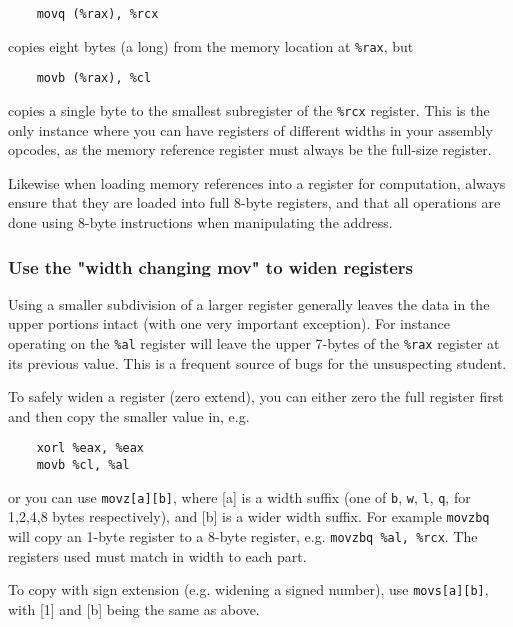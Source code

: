 \documentclass[11pt]{article}
\begin{document}
\begin{lstlisting}
    movq (%rax), %rcx
\end{lstlisting}

copies eight bytes (a  long) from the memory location at \texttt{\%rax}, but

\begin{lstlisting}
    movb (%rax), %cl
\end{lstlisting}

copies a single byte to the smallest subregister of the \texttt{\%rcx} register. This is
the only instance where you can have registers of different widths in your assembly
opcodes, as the memory reference register must always be the full-size register.

Likewise when loading memory references into a register for computation, always ensure that
they are loaded into full 8-byte registers, and that all operations are done using 8-byte
instructions when manipulating the address.

\subsubsection{Use the "width changing mov" to widen registers}

Using a smaller subdivision of a larger register generally leaves the data in the upper
portions intact (with one very important exception). For instance operating on the
\texttt{\%al} register will leave the upper 7-bytes of the \texttt{\%rax} register at its
previous value. This is a frequent source of bugs for the unsuspecting student.

To safely widen a register (zero extend), you can either zero the full register first and
then copy the smaller value in, e.g.

\begin{lstlisting}
    xorl %eax, %eax
    movb %cl, %al
\end{lstlisting}

or you can use \texttt{movz[a][b]}, where [a] is a width suffix (one of \texttt{b},
\texttt{w}, \texttt{l}, \texttt{q}, for 1,2,4,8 bytes respectively), and [b] is a wider
width suffix. For example \texttt{movzbq} will copy an 1-byte register to a 8-byte
register, e.g. \texttt{movzbq \%al, \%rcx}. The registers used must match in width to each
part.

To copy with sign extension (e.g. widening a signed number), use \texttt{movs[a][b]}, with
[1] and [b] being the same as above.
\end{document}
